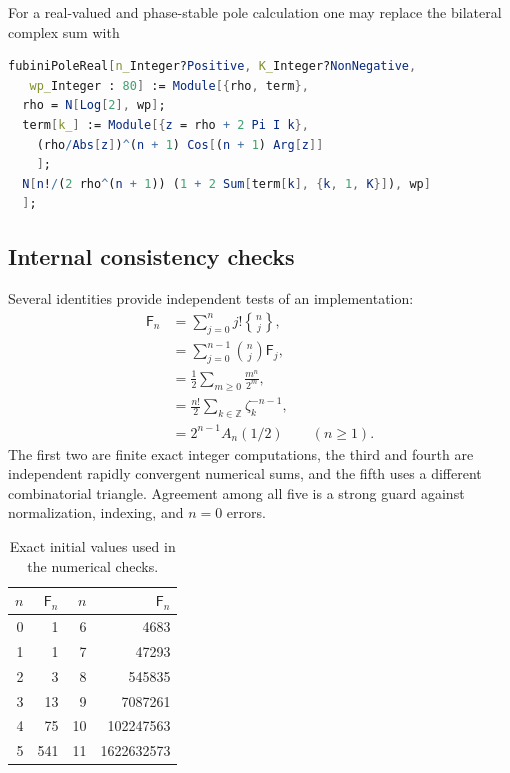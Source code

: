 \documentclass[11pt,a4paper,oneside]{article}
\theoremstyle{definition}
\theoremstyle{remark}
\newcommand{\Fub}{\mathsf{F}}
\newcommand{\StirlingII}[2]{\genfrac\{\}{0pt}{}{#1}{#2}}
\begin{document}
For a real-valued and phase-stable pole calculation one may replace the
bilateral complex sum with

\begin{lstlisting}[language=Mathematica]
fubiniPoleReal[n_Integer?Positive, K_Integer?NonNegative,
   wp_Integer : 80] := Module[{rho, term},
  rho = N[Log[2], wp];
  term[k_] := Module[{z = rho + 2 Pi I k},
    (rho/Abs[z])^(n + 1) Cos[(n + 1) Arg[z]]
    ];
  N[n!/(2 rho^(n + 1)) (1 + 2 Sum[term[k], {k, 1, K}]), wp]
  ];
\end{lstlisting}

\subsection{Internal consistency checks}
Several identities provide independent tests of an implementation:
\begin{align*}
 \Fub_n
 &=\sum_{j=0}^{n}j!\StirlingII{n}{j},\\
 &=\sum_{j=0}^{n-1}\binom{n}{j}\Fub_j,\\
 &=\frac12\sum_{m\ge0}\frac{m^n}{2^m},\\
 &=\frac{n!}{2}\sum_{k\in\mathbb Z}\zeta_k^{-n-1},\\
 &=2^{n-1}A_n(1/2)\qquad(n\ge1).
\end{align*}
The first two are finite exact integer computations, the third and fourth are
independent rapidly convergent numerical sums, and the fifth uses a different
combinatorial triangle.  Agreement among all five is a strong guard against
normalization, indexing, and $n=0$ errors.

\begin{table}[htbp]
\centering
\caption{Exact initial values used in the numerical checks.}
\label{tab:initial-values}
\begin{tabular}{@{}r r@{\qquad}r r@{}}
\toprule
$n$ & $\Fub_n$ & $n$ & $\Fub_n$\\
\midrule
0 & 1 & 6 & 4683\\
1 & 1 & 7 & 47293\\
2 & 3 & 8 & 545835\\
3 & 13 & 9 & 7087261\\
4 & 75 & 10 & 102247563\\
5 & 541 & 11 & 1622632573\\
\bottomrule
\end{tabular}
\end{table}
\end{document}
